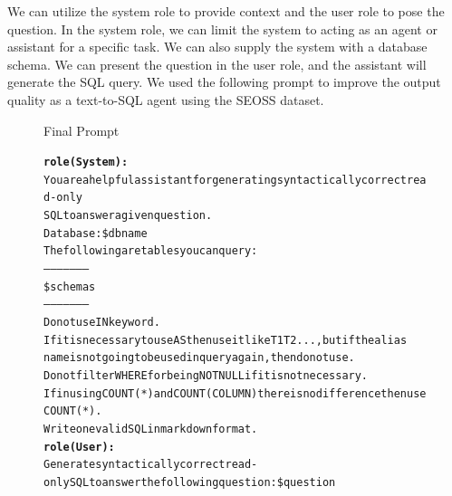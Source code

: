We can utilize the system role to provide context and the user role to pose the question. In the system role, we can limit the system to acting as an agent or assistant for a specific task. We can also supply the system with a database schema. We can present the question in the user role, and the assistant will generate the SQL query. We used the following prompt to improve the output quality as a text-to-SQL agent using the SEOSS dataset.

\begin{figure}[H]
    \begin{AIbox}{Final Prompt}
        \vspace{-5px}
        \parbox{1\textwidth}{\scriptsize
        \begin{alltt} 
            {\bf role(System):} \\ 
            You are a helpful assistant for generating syntactically correct read-only                   \\
            SQL to answer a given question.                                                              \\
            Database: \$dbname                                                                           \\
            The following are tables you can query:                                                      \\
            ---------------------                                                                        \\
            \$schemas                                                                                    \\
            ---------------------                                                                        \\
            Do not use IN keyword.                                                                       \\
            If it is necessary to use AS then use it like T1 T2 ..., but if the alias                    \\
            name is not going to be used in query again, then do not use.                                \\
            Do not filter WHERE for being NOT NULL if it is not necessary.                               \\
            If in using  COUNT(*) and COUNT(COLUMN) there is no difference then use COUNT(*). \\
            Write one valid SQL in markdown format.
            \\
            {\bf role(User):} \\
            Generate syntactically correct read-only SQL to answer the following question: \$question
        \end{alltt}
        }
        \vspace{-5px}
    \end{AIbox}
\end{figure}

